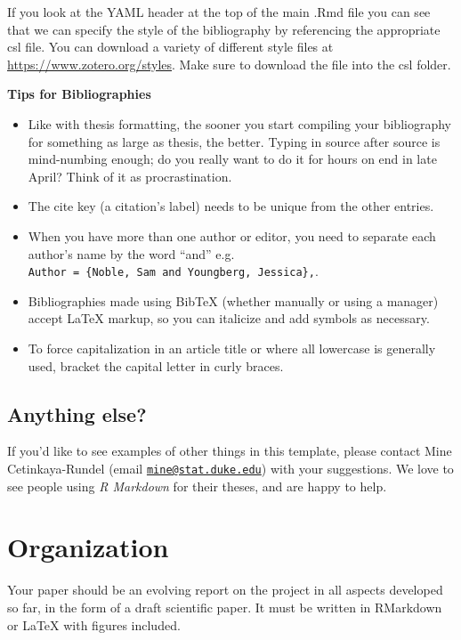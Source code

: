 \documentclass[12pt,twoside]{dukestatscithesis}
\providecommand{\tightlist}{%
  \setlength{\itemsep}{0pt}\setlength{\parskip}{0pt}}
\theoremstyle{definition}
\theoremstyle{definition}
\theoremstyle{definition}
\theoremstyle{remark}
\begin{document}
If you look at the YAML header at the top of the main .Rmd file you can
see that we can specify the style of the bibliography by referencing the
appropriate csl file. You can download a variety of different style
files at \url{https://www.zotero.org/styles}. Make sure to download the
file into the csl folder.

\textbf{Tips for Bibliographies}
\begin{itemize}
\tightlist
\item
  Like with thesis formatting, the sooner you start compiling your
  bibliography for something as large as thesis, the better. Typing in
  source after source is mind-numbing enough; do you really want to do
  it for hours on end in late April? Think of it as procrastination.
\item
  The cite key (a citation's label) needs to be unique from the other
  entries.
\item
  When you have more than one author or editor, you need to separate
  each author's name by the word ``and'' e.g.
  \texttt{Author\ =\ \{Noble,\ Sam\ and\ Youngberg,\ Jessica\},}.
\item
  Bibliographies made using BibTeX (whether manually or using a manager)
  accept LaTeX markup, so you can italicize and add symbols as
  necessary.
\item
  To force capitalization in an article title or where all lowercase is
  generally used, bracket the capital letter in curly braces.
\end{itemize}
\section{Anything else?}\label{anything-else}

If you'd like to see examples of other things in this template, please
contact Mine Cetinkaya-Rundel (email
\href{mailto:mine@stat.duke.edu}{\nolinkurl{mine@stat.duke.edu}}) with
your suggestions. We love to see people using \emph{R Markdown} for
their theses, and are happy to help.

\chapter{Organization}\label{organization}

Your paper should be an evolving report on the project in all aspects
developed so far, in the form of a draft scientific paper. It must be
written in RMarkdown or LaTeX with figures included.
\end{document}
